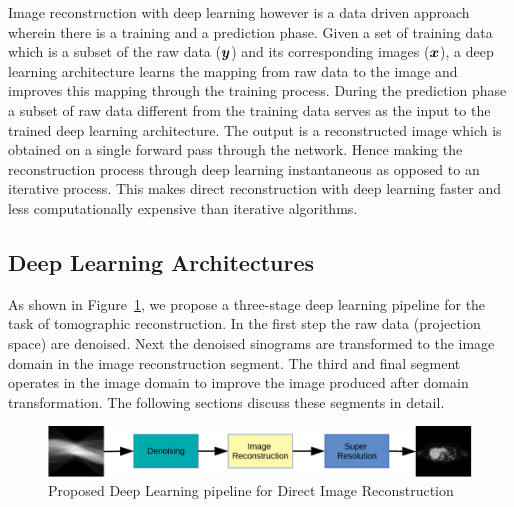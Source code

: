 Image reconstruction with deep learning however is a data driven approach wherein there is a training and a prediction phase. Given a set of training data which is a subset of the raw data ($\bm{y}$) and its corresponding images ($\bm{x}$), a deep learning architecture learns the mapping from raw data to the image and improves this mapping through the training process. During the prediction phase a subset of raw data different from the training data serves as the input to the trained deep learning architecture. The output is a reconstructed image which is obtained on a single forward pass through the network. Hence making the reconstruction process through deep learning instantaneous as opposed to an iterative process. This makes direct reconstruction with deep learning faster and less computationally expensive than iterative algorithms.

\subsection{Deep Learning Architectures}

As shown in Figure~\ref{fig:approach}, we propose a three-stage deep learning pipeline for the task of tomographic reconstruction. In the first step the raw data (projection space) are denoised. Next the denoised sinograms are transformed to the image domain in the image reconstruction segment. The third and final segment operates in the image domain to improve the image produced after domain transformation. The following sections discuss these segments in detail.

\begin{figure}[!htbp]
	\centering
	\includegraphics[width=0.99\linewidth]{./Figures/three-step-crop.pdf}
	\caption{Proposed Deep Learning pipeline for Direct Image Reconstruction}
	\label{fig:approach}
\end{figure}

